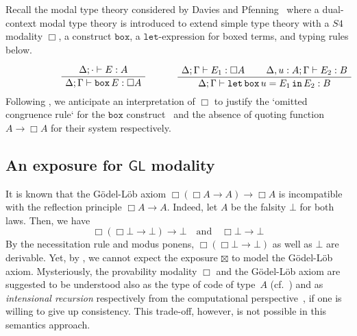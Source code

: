 \documentclass[a4paper,UKenglish,numberwithinsect,cleveref,thm-restate]{lipics-v2021}
\theoremstyle{plain}
\begin{document}
\begin{remark}\label{remark:S4-modality}
Recall the modal type theory considered by Davies and Pfenning~\cite{Davies2001b} where a dual-context modal type theory is introduced to extend simple type theory with a $S4$ modality $\Box$, a construct $\mathtt{box}$, a $\mathtt{let}$-expression for boxed terms, and typing rules below.
\[
\begin{minipage}{.47\linewidth}
  \begin{prooftree}
    \AxiomC{$\Delta; \cdot \vdash E : A$}
    \UnaryInfC{$\Delta; \Gamma \vdash \mathtt{box}\,E:\Box A$}
  \end{prooftree}
\end{minipage}%
\begin{minipage}{0.47\linewidth}
  \begin{prooftree}
    \AxiomC{$\Delta; \Gamma \vdash E_1 : \Box A$}
    \AxiomC{$\Delta, u : A; \Gamma \vdash E_2 : B$}
  \BinaryInfC{$\Delta; \Gamma \vdash \mathtt{let}\,\mathtt{box}\, u = E_1\, \mathtt{in}\,E_2 : B$}
  \end{prooftree}
\end{minipage}
\]
Following , we anticipate an interpretation of $\Box$ to justify the `omitted congruence rule` for the $\mathtt{box}$ construct~\cite[Section~2.5]{Davies2001b} and the absence of quoting function $A \to \Box A$ for their system respectively.
\end{remark}

\subsection{An exposure for \texorpdfstring{$\mathsf{GL}$}{GL} modality}
It is known that the Gödel-Löb axiom $\Box(\Box A \to A) \to \Box A$ is incompatible with the reflection principle $\Box A \to A$.
Indeed, let $A$ be the falsity $\bot$ for both laws. Then, we have
\[
  \Box(\Box \bot \to \bot) \to \bot
  \quad\text{and}\quad
  \Box \bot \to \bot
\]
By the necessitation rule and modus ponens, $\Box (\Box \bot \to \bot)$ as well as $\bot$ are derivable.
Yet, by , we cannot expect the exposure $\boxtimes$ to model the Gödel-Löb axiom.
Mysteriously, the provability modality $\Box$ and the Gödel-Löb axiom are suggested to be understood also as the type of code of type~$A$ (cf.~) and as \emph{intensional recursion} respectively from the computational perspective~\cite{Kavvos2017b}, if one is willing to give up consistency.
This trade-off, however, is not possible in this semantics approach.
\end{document}
